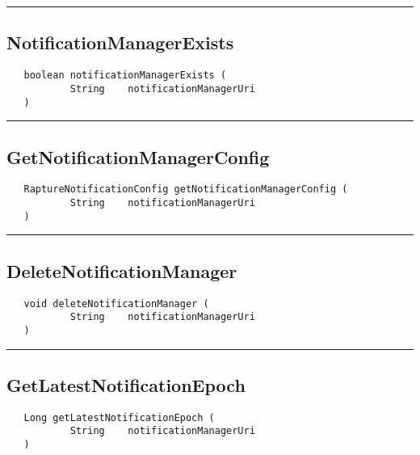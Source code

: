 \rule{15cm}{2pt}
\subsection{NotificationManagerExists}
\label{Api:NotificationManagerExists}
\begin{verbatim}
   boolean notificationManagerExists (
           String    notificationManagerUri
   )
\end{verbatim}



\rule{15cm}{2pt}
\subsection{GetNotificationManagerConfig}
\label{Api:GetNotificationManagerConfig}
\begin{verbatim}
   RaptureNotificationConfig getNotificationManagerConfig (
           String    notificationManagerUri
   )
\end{verbatim}



\rule{15cm}{2pt}
\subsection{DeleteNotificationManager}
\label{Api:DeleteNotificationManager}
\begin{verbatim}
   void deleteNotificationManager (
           String    notificationManagerUri
   )
\end{verbatim}



\rule{15cm}{2pt}
\subsection{GetLatestNotificationEpoch}
\label{Api:GetLatestNotificationEpoch}
\begin{verbatim}
   Long getLatestNotificationEpoch (
           String    notificationManagerUri
   )
\end{verbatim}



